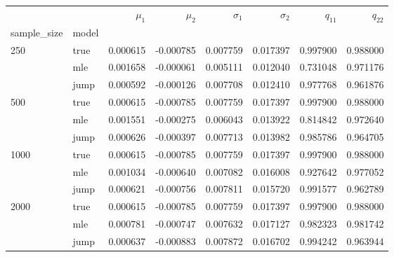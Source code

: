 \begin{tabular}{llrrrrrr}
\toprule
     &      &   $\mu_1$ &   $\mu_2$ &  $\sigma_1$ &  $\sigma_2$ &    $q_11$ &    $q_22$ \\
sample_size & model &           &           &             &             &           &           \\
\midrule
250  & true &  0.000615 & -0.000785 &    0.007759 &    0.017397 &  0.997900 &  0.988000 \\
     & mle &  0.001658 & -0.000061 &    0.005111 &    0.012040 &  0.731048 &  0.971176 \\
     & jump &  0.000592 & -0.000126 &    0.007708 &    0.012410 &  0.977768 &  0.961876 \\
500  & true &  0.000615 & -0.000785 &    0.007759 &    0.017397 &  0.997900 &  0.988000 \\
     & mle &  0.001551 & -0.000275 &    0.006043 &    0.013922 &  0.814842 &  0.972640 \\
     & jump &  0.000626 & -0.000397 &    0.007713 &    0.013982 &  0.985786 &  0.964705 \\
1000 & true &  0.000615 & -0.000785 &    0.007759 &    0.017397 &  0.997900 &  0.988000 \\
     & mle &  0.001034 & -0.000640 &    0.007082 &    0.016008 &  0.927642 &  0.977052 \\
     & jump &  0.000621 & -0.000756 &    0.007811 &    0.015720 &  0.991577 &  0.962789 \\
2000 & true &  0.000615 & -0.000785 &    0.007759 &    0.017397 &  0.997900 &  0.988000 \\
     & mle &  0.000781 & -0.000747 &    0.007632 &    0.017127 &  0.982323 &  0.981742 \\
     & jump &  0.000637 & -0.000883 &    0.007872 &    0.016702 &  0.994242 &  0.963944 \\
\bottomrule
\end{tabular}
